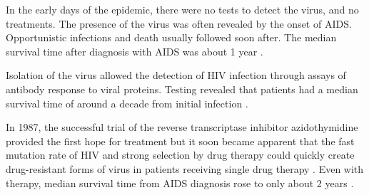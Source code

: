 \documentclass[../sherrill-Mix_thesis.tex]{subfiles}
\begin{document}
	





	In the early days of the epidemic, there were no tests to detect the virus, and no treatments.  The presence of the virus was often revealed by the onset of AIDS. Opportunistic infections \citep{Moore1996} and death usually followed soon after. The median survival time after diagnosis with AIDS was about 1 year \citep{Rothenberg1987,Vella1992}. 

	Isolation of the virus allowed the detection of HIV infection through assays of antibody response to viral proteins. Testing revealed that patients had a median survival time of around a decade from initial infection \citep{Lui1986,Deschamps2000,Harrison2010,CGAIDSIHIVS2000}. %
	
	In 1987, the successful trial of the reverse transcriptase inhibitor azidothymidine provided the first hope for treatment \citep{Fischl1987,Fischl1989,Volberding1990} but it soon became apparent that the fast mutation rate of HIV \citep{Hahn1986,Preston1988,Roberts1988,Mansky1995,Mansky1996,Abram2010,Achuthan2014} and strong selection by drug therapy could quickly create drug-resistant forms of virus in patients receiving single drug therapy \citep{Larder1989,Larder1989a,Land1990,Boucher1990,Richman1990,Richman1991,Fitzgibbon1992,Richman1994,Schuurman1995,Schmit1996}. Even with therapy, median survival time from AIDS diagnosis rose to only about 2 years \citep{Creagh-Kirk1988,Fischl1989,Moore1992,Vella1992}. 
	
\end{document}
